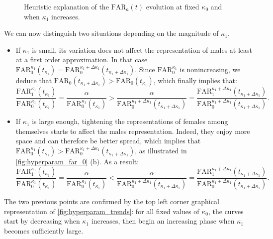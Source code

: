 \documentclass[nohyperref]{article}
\theoremstyle{plain}
\theoremstyle{definition}
\theoremstyle{remark}
\begin{document}
\begin{figure}[h]
    \centering
    

    
    




\caption{Heuristic explanation of the $\mathrm{FAR}_a(t)$ evolution at fixed $\kappa_0$ and when $\kappa_1$ increases.}\label{fig:hyperparam_far_0}
\end{figure}




We can now distinguish two situations depending on the magnitude of $\kappa_1$.
\begin{itemize}
    \item If $\kappa_1$ is small, its variation does not affect the representation of males at least at a first order approximation. In that case $\mathrm{FAR}^{\kappa_1}_0(t_{\kappa_1}) = \mathrm{FAR}_0^{\kappa_1 + \Delta \kappa_1}(t_{\kappa_1 + \Delta \kappa_1})$. Since $\mathrm{FAR}^{\kappa_1}_0$ is nonincreasing, we deduce that $\mathrm{FAR}_0(t_{\kappa_1 + \Delta \kappa_1}) > \mathrm{FAR}_0(t_{\kappa_1})$, which finally implies that:
\[ \frac{\mathrm{FAR}^{\kappa_1}_1(t_{\kappa_1})}{\mathrm{FAR}^{\kappa_1}_0(t_{\kappa_1})} = \frac{\alpha}{\mathrm{FAR}^{\kappa_1}_0(t_{\kappa_1})} > \frac{\alpha}{\mathrm{FAR}_0^{\kappa_1 + \Delta \kappa_1}(t_{\kappa_1 + \Delta \kappa_1})} = \frac{\mathrm{FAR}^{\kappa_1 + \Delta \kappa_1}_1(t_{\kappa_1 + \Delta \kappa_1})}{\mathrm{FAR}^{\kappa_1 + \Delta \kappa_1}_0(t_{\kappa_1 + \Delta \kappa_1})}.  \] 

    \item If $\kappa_1$ is large enough, tightening the representations of females among themselves starts to affect the males representation. Indeed, they enjoy more space and can therefore be better spread, which implies that $\mathrm{FAR}^{\kappa_1}_0(t_{\kappa_1}) > \mathrm{FAR}_0^{\kappa_1 + \Delta \kappa_1}(t_{\kappa_1 + \Delta \kappa_1})$, as illustrated in \autoref{fig:hyperparam_far_0} (b). As a result:
    \[ \frac{\mathrm{FAR}^{\kappa_1}_1(t_{\kappa_1})}{\mathrm{FAR}^{\kappa_1}_0(t_{\kappa_1})} = \frac{\alpha}{\mathrm{FAR}^{\kappa_1}_0(t_{\kappa_1})} < \frac{\alpha}{\mathrm{FAR}_0^{\kappa_1 + \Delta \kappa_1}(t_{\kappa_1 + \Delta \kappa_1})} = \frac{\mathrm{FAR}^{\kappa_1 + \Delta \kappa_1}_1(t_{\kappa_1 + \Delta \kappa_1})}{\mathrm{FAR}^{\kappa_1 + \Delta \kappa_1}_0(t_{\kappa_1 + \Delta \kappa_1})}.  \] 
\end{itemize}
The two previous points are confirmed by the top left corner graphical representation of \autoref{fig:hyperparam_trends}: for all fixed values of $\kappa_0$, the curves start by decreasing when $\kappa_1$ increases, then begin an increasing phase when $\kappa_1$ becomes sufficiently large.
\end{document}
